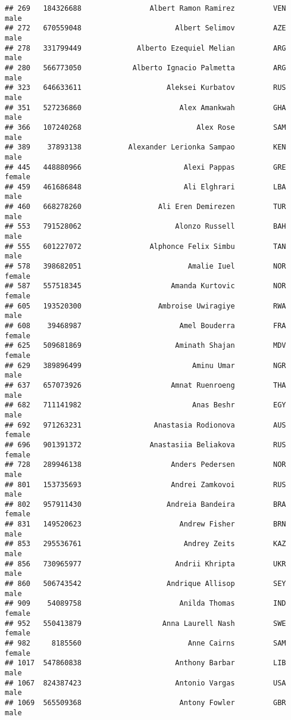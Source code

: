\documentclass[]{article}
\begin{document}
\begin{verbatim}
## 269   184326688                Albert Ramon Ramirez         VEN   male
## 272   670559048                      Albert Selimov         AZE   male
## 278   331799449             Alberto Ezequiel Melian         ARG   male
## 280   566773050            Alberto Ignacio Palmetta         ARG   male
## 323   646633611                    Aleksei Kurbatov         RUS   male
## 351   527236860                       Alex Amankwah         GHA   male
## 366   107240268                           Alex Rose         SAM   male
## 389    37893138           Alexander Lerionka Sampao         KEN   male
## 445   448880966                        Alexi Pappas         GRE female
## 459   461686848                        Ali Elghrari         LBA   male
## 460   668278260                  Ali Eren Demirezen         TUR   male
## 553   791528062                      Alonzo Russell         BAH   male
## 555   601227072                Alphonce Felix Simbu         TAN   male
## 578   398682051                         Amalie Iuel         NOR female
## 587   557518345                     Amanda Kurtovic         NOR female
## 605   193520300                  Ambroise Uwiragiye         RWA   male
## 608    39468987                       Amel Bouderra         FRA female
## 625   509681869                      Aminath Shajan         MDV female
## 629   389896499                          Aminu Umar         NGR   male
## 637   657073926                     Amnat Ruenroeng         THA   male
## 682   711141982                          Anas Beshr         EGY   male
## 692   971263231                 Anastasia Rodionova         AUS female
## 696   901391372                Anastasiia Beliakova         RUS female
## 728   289946138                     Anders Pedersen         NOR   male
## 801   153735693                     Andrei Zamkovoi         RUS   male
## 802   957911430                    Andreia Bandeira         BRA female
## 831   149520623                       Andrew Fisher         BRN   male
## 853   295536761                        Andrey Zeits         KAZ   male
## 856   730965977                      Andrii Khripta         UKR   male
## 860   506743542                    Andrique Allisop         SEY   male
## 909    54089758                       Anilda Thomas         IND female
## 952   550413879                   Anna Laurell Nash         SWE female
## 982     8185560                         Anne Cairns         SAM female
## 1017  547860838                      Anthony Barbar         LIB   male
## 1067  824387423                      Antonio Vargas         USA   male
## 1069  565509368                       Antony Fowler         GBR   male

\end{verbatim}
\end{document}
